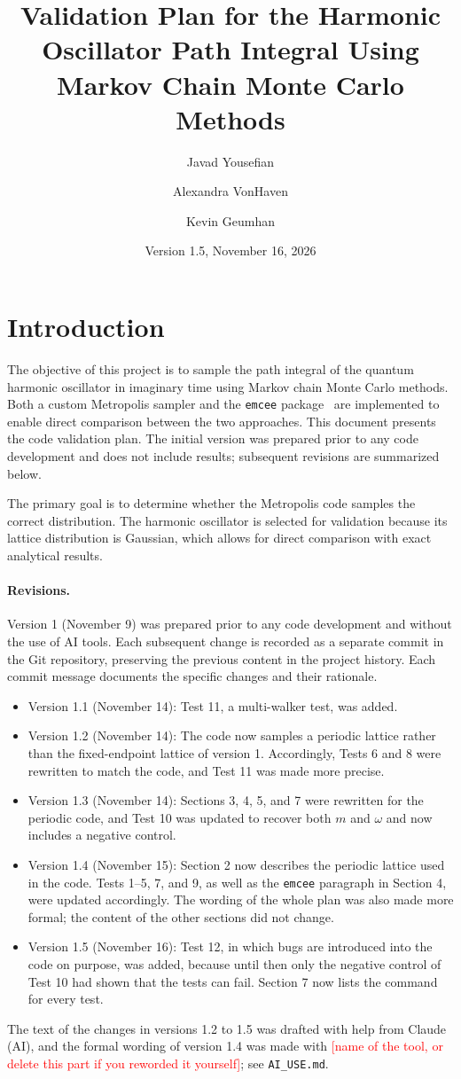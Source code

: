\documentclass[11pt]{article}
\title{Validation Plan for the Harmonic Oscillator Path Integral Using Markov Chain Monte Carlo Methods}
\author{Javad Yousefian \and Alexandra VonHaven \and Kevin Geumhan}
\date{Version 1.5, November 16, 2026}
\newcommand{\fillin}[1]{\textcolor{red}{[#1]}}
\begin{document}
\maketitle

\section{Introduction}
The objective of this project is to sample the path integral of the quantum harmonic oscillator in imaginary time using Markov chain Monte Carlo methods. Both a custom Metropolis sampler and the \texttt{emcee} package~\cite{emcee} are implemented to enable direct comparison between the two approaches. This document presents the code validation plan. The initial version was prepared prior to any code development and does not include results; subsequent revisions are summarized below.

The primary goal is to determine whether the Metropolis code samples the correct distribution. The harmonic oscillator is selected for validation because its lattice distribution is Gaussian, which allows for direct comparison with exact analytical results.

\paragraph{Revisions.} Version 1 (November 9) was prepared prior to any code development and without the use of AI tools. Each subsequent change is recorded as a separate commit in the Git repository, preserving the previous content in the project history. Each commit message documents the specific changes and their rationale.
\begin{itemize}
  \item Version 1.1 (November 14): Test 11, a multi-walker test, was added.
  \item Version 1.2 (November 14): The code now samples a periodic lattice rather than the fixed-endpoint lattice of version 1. Accordingly, Tests 6 and 8 were rewritten to match the code, and Test 11 was made more precise.
  \item Version 1.3 (November 14): Sections 3, 4, 5, and 7 were rewritten for the periodic code, and Test 10 was updated to recover both $m$ and $\omega$ and now includes a negative control.
  \item Version 1.4 (November 15): Section 2 now describes the periodic lattice used in the code. Tests 1--5, 7, and 9, as well as the \texttt{emcee} paragraph in Section 4, were updated accordingly. The wording of the whole plan was also made more formal; the content of the other sections did not change.
  \item Version 1.5 (November 16): Test 12, in which bugs are introduced into the code on purpose, was added, because until then only the negative control of Test 10 had shown that the tests can fail. Section 7 now lists the command for every test.
\end{itemize}
The text of the changes in versions 1.2 to 1.5 was drafted with help from Claude (AI), and the formal wording of version 1.4 was made with \fillin{name of the tool, or delete this part if you reworded it yourself}; see \texttt{AI\_USE.md}.
\end{document}

